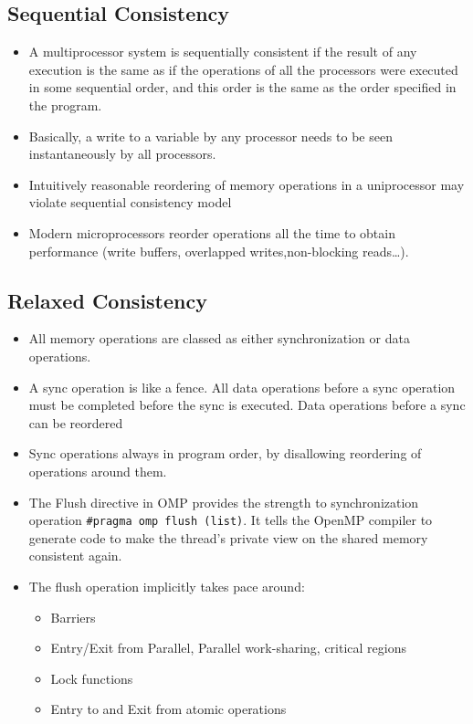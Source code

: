 \documentclass{article}
\begin{document}
\subsection{Sequential Consistency}
\begin{itemize}
    \item A multiprocessor system is sequentially consistent if the result of any execution is the same as if the operations of all the processors were executed in some sequential order, and this order is the same as the order specified in the program.
    
    \item Basically, a write to a variable by any processor needs to be seen instantaneously by all processors.
    
    \item Intuitively reasonable reordering of memory operations in a uniprocessor may violate sequential consistency model

    \item Modern microprocessors reorder operations all the time to obtain performance (write buffers, overlapped writes,non-blocking reads…).
\end{itemize}

\subsection{Relaxed Consistency}
\begin{itemize}
    \item All memory operations are classed as either synchronization or data operations. 
    
    \item A sync operation is like a fence. All data operations before a sync operation must be completed before the sync is executed. Data operations before a sync can be reordered
    
    \item Sync operations always in program order, by disallowing reordering of operations around them. 
    
    \item The Flush directive in OMP provides the strength to synchronization operation \texttt{\#pragma omp flush (list)}. It tells the OpenMP compiler to generate code to make the thread's private view on the shared memory consistent again.
    
    \item The flush operation implicitly takes pace around:
    \begin{itemize}
        \item Barriers
        
        \item Entry/Exit from Parallel, Parallel work-sharing, critical regions
        
        \item Lock functions
        
        \item Entry to and Exit from atomic operations
    \end{itemize}
\end{itemize}
\end{document}
